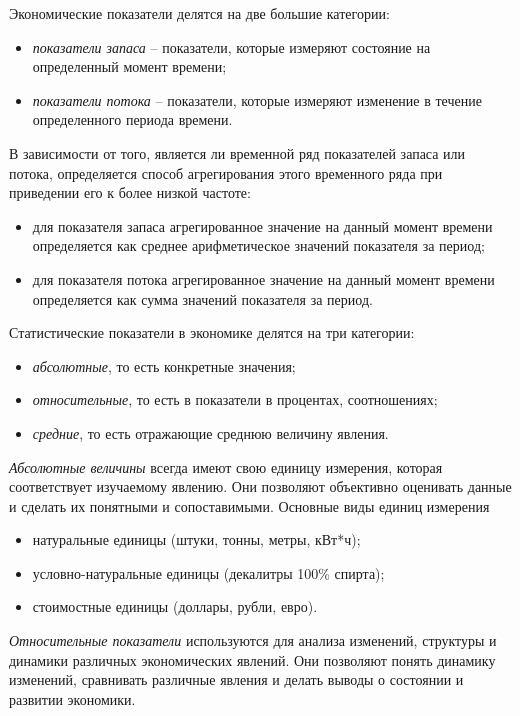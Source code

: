 \documentclass[a4paper, 14pt]{extreport}
\numberwithin{equation}{section}
\numberwithin{equation}{section}
\begin{document}
	Экономические показатели делятся на две большие категории:
	\begin{itemize}
		\item \textit{показатели запаса} --
		показатели, которые измеряют состояние на определенный момент времени;
		\item \textit{показатели потока} --
		показатели, которые измеряют изменение в течение определенного периода времени.		
	\end{itemize}
	В зависимости от того, является ли временной ряд показателей запаса или потока, определяется способ агрегирования этого временного ряда при приведении его к более низкой частоте:
	\begin{itemize}
		\item для показателя запаса агрегированное значение на данный момент времени определяется как среднее арифметическое значений показателя за период;
		\item для показателя потока агрегированное значение на данный момент времени определяется как сумма значений показателя за период.
	\end{itemize}
	
	Статистические показатели в экономике делятся на три категории:
	\begin{itemize}
		\item \textit{абсолютные}, то есть конкретные значения;
		\item \textit{относительные}, то есть в показатели в процентах, соотношениях;
		\item \textit{средние}, то есть отражающие среднюю величину явления.
	\end{itemize}

	\textit{Абсолютные величины} всегда имеют свою единицу измерения, которая соответствует изучаемому явлению. Они позволяют объективно оценивать данные и сделать их понятными и сопоставимыми. Основные виды единиц измерения
	\begin{itemize}
		\item натуральные единицы (штуки, тонны, метры, кВт*ч);
		\item условно-натуральные единицы (декалитры 100\% спирта);
		\item стоимостные единицы (доллары, рубли, евро).
	\end{itemize}
	
	\textit{Относительные показатели} используются для анализа изменений, структуры и динамики различных экономических явлений. Они позволяют понять динамику изменений, сравнивать различные явления и делать выводы о состоянии и развитии экономики.
	
\end{document}
